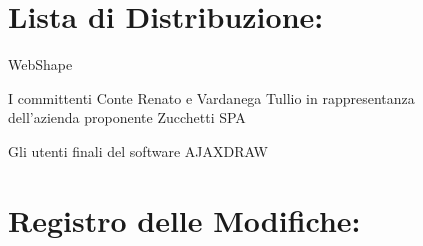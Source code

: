 \textbf{}

\section*{\LARGE Lista di Distribuzione:}
 
  \begin{elenconumerato}{\normindent}
    \item WebShape
    \item I committenti Conte Renato e Vardanega Tullio in rappresentanza \\ dell'azienda proponente Zucchetti SPA
    \item Gli utenti finali del software AJAXDRAW
  \end{elenconumerato}
 
 
 
 
\section*{\Large Registro delle Modifiche:}
 
